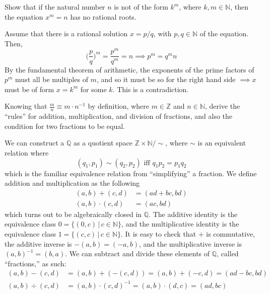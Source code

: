 \documentclass{article}
\begin{document}
    \begin{exercise}[Zorich 2.2.9]
    Show that if the natural number $n$ is not of the form $k^m$, where $k, m \in \mathbb{N}$, then the equation $x^m = n$ has no rational roots. 
    \end{exercise}

    \begin{solution}
    Assume that there is a rational solution $x = p/q$, with $p, q \in \mathbb{N}$ of the equation. Then, 
    \[\bigg( \frac{p}{q}\bigg)^m = \frac{p^m}{q^m} = n \implies p^m = q^m n\]
    By the fundamental theorem of arithmetic, the exponents of the prime factors of $p^m$ must all be multiples of $m$, and so it must be so for the right hand side $\implies x$ must be of form $x = k^m$ for some $k$. This is a contradiction. 
    \end{solution}

    \begin{exercise}[Zorich 2.2.12]
    Knowing that $\frac{m}{n} \equiv m \cdot n^{-1}$ by definition, where $m \in \mathbb{Z}$ and $n \in \mathbb{N}$, derive the ``rules'' for addition, multiplication, and division of fractions, and also the condition for two fractions to be equal. 
    \end{exercise}

    \begin{solution}
    We can construct a $\mathbb{Q}$ as a quotient space $\mathbb{Z} \times \mathbb{N} / \sim$, where $\sim$ is an equivalent relation where 
    \[(q_1, p_1) \sim (q_2 , p_2) \text{ iff } q_1 p_2 = p_1 q_2\]
    which is the familiar equivalence relation from ``simplifying'' a fraction. We define addition and multiplication as the following 
    \begin{align*}
        (a, b) + (c, d) & = (ad + bc, bd) \\
        (a, b) \cdot (c, d) & = (ac, bd) 
    \end{align*}
    which turns out to be algebraically closed in $\mathbb{Q}$. The additive identity is the equivalence class $0 = \{(0, c) \,|\, c \in \mathbb{N}\}$, and the multiplicative identity is the equivalence class $1 = \{(c, c) \,|\, c \in \mathbb{N}\}$. It is easy to check that $+$ is commutative, the additive inverse is $-(a, b) = (-a, b)$, and the multiplicative inverse is $(a, b)^{-1} = (b, a)$. We can subtract and divide these elements of $\mathbb{Q}$, called ``fractions,'' as such: 
    \begin{align*}
        (a, b) - (c, d) & = (a, b) + (-(c, d)) = (a, b) + (-c, d) = (ad - bc, bd) \\
        (a, b) \div (c, d) & = (a, b) \cdot (c, d)^{-1} = (a, b) \cdot (d, c) = (ad, bc) 
    \end{align*}
    \end{solution}
\end{document}
